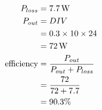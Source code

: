 \subsection{}

\begin{align*}
P_{loss} & = \unit[7.7]{W} \\
P_{out}  & = DIV \\
         & = 0.3 \times 10 \times 24 \\
         & = \unit[72]{W} \\
\text{efficiency} & = \frac{P_{out}}{P_{out}+P_{loss}} \\
                  & = \frac{72}{72+7.7} \\
                  & = 90.3\%
\end{align*}
